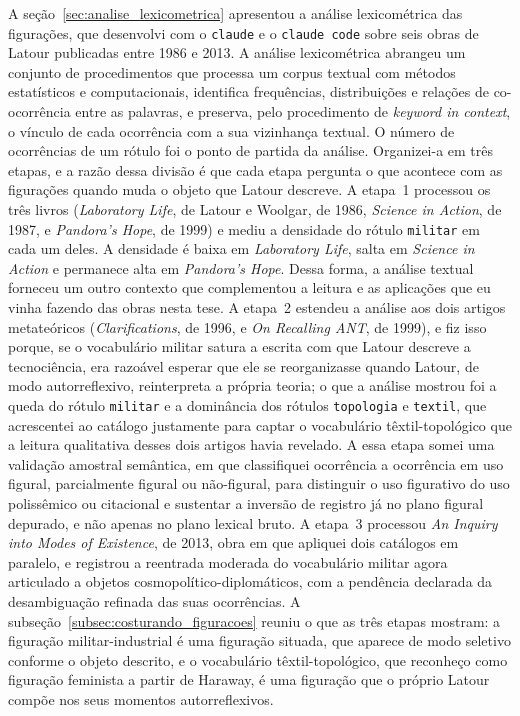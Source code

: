 A seção~\ref{sec:analise_lexicometrica} apresentou a análise lexicométrica das figurações, que desenvolvi com o \texttt{claude} e o \texttt{claude code} sobre seis obras de Latour publicadas entre 1986 e 2013. A análise lexicométrica abrangeu um conjunto de procedimentos que processa um corpus textual com métodos estatísticos e computacionais, identifica frequências, distribuições e relações de co-ocorrência entre as palavras, e preserva, pelo procedimento de \emph{keyword in context}, o vínculo de cada ocorrência com a sua vizinhança textual. O número de ocorrências de um rótulo foi o ponto de partida da análise. Organizei-a em três etapas, e a razão dessa divisão é que cada etapa pergunta o que acontece com as figurações quando muda o objeto que Latour descreve. A etapa~1 processou os três livros (\emph{Laboratory Life}, de Latour e Woolgar, de 1986, \emph{Science in Action}, de 1987, e \emph{Pandora's Hope}, de 1999) e mediu a densidade do rótulo \texttt{militar} em cada um deles. A densidade é baixa em \emph{Laboratory Life}, salta em \emph{Science in Action} e permanece alta em \emph{Pandora's Hope}. Dessa forma, a análise textual forneceu um outro contexto que complementou a leitura e as aplicações que eu vinha fazendo das obras nesta tese. A etapa~2 estendeu a análise aos dois artigos metateóricos (\emph{Clarifications}, de 1996, e \emph{On Recalling ANT}, de 1999), e fiz isso porque, se o vocabulário militar satura a escrita com que Latour descreve a tecnociência, era razoável esperar que ele se reorganizasse quando Latour, de modo autorreflexivo, reinterpreta a própria teoria; o que a análise mostrou foi a queda do rótulo \texttt{militar} e a dominância dos rótulos \texttt{topologia} e \texttt{textil}, que acrescentei ao catálogo justamente para captar o vocabulário têxtil-topológico que a leitura qualitativa desses dois artigos havia revelado. A essa etapa somei uma validação amostral semântica, em que classifiquei ocorrência a ocorrência em uso figural, parcialmente figural ou não-figural, para distinguir o uso figurativo do uso polissêmico ou citacional e sustentar a inversão de registro já no plano figural depurado, e não apenas no plano lexical bruto. A etapa~3 processou \emph{An Inquiry into Modes of Existence}, de 2013, obra em que apliquei dois catálogos em paralelo, e registrou a reentrada moderada do vocabulário militar agora articulado a objetos cosmopolítico-diplomáticos, com a pendência declarada da desambiguação refinada das suas ocorrências. A subseção~\ref{subsec:costurando_figuracoes} reuniu o que as três etapas mostram: a figuração militar-industrial é uma figuração situada, que aparece de modo seletivo conforme o objeto descrito, e o vocabulário têxtil-topológico, que reconheço como figuração feminista a partir de Haraway, é uma figuração que o próprio Latour compõe nos seus momentos autorreflexivos.

